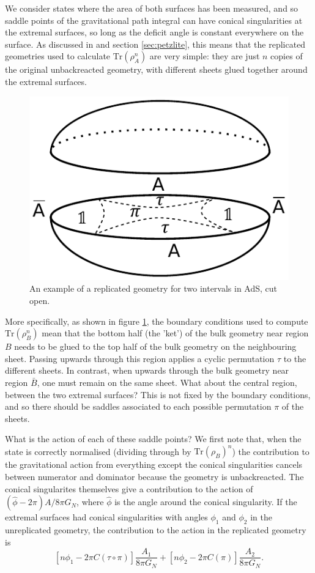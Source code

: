 \documentclass[12pt]{article}
\numberwithin{equation}{section}
\def\tr{\text{Tr}}
\begin{document}
We consider states where the area of both surfaces has been measured, and so saddle points of the gravitational path integral can have conical singularities at the extremal surfaces, so long as the deficit angle is constant everywhere on the surface. As discussed in \cite{Akers:2018fow,Dong:2018seb} and section \ref{sec:petzlite}, this means that the replicated geometries used to calculate $\tr(\rho_A^n)$ are very simple: they are just $n$ copies of the original unbackreacted geometry, with different sheets glued together around the extremal surfaces.
\begin{figure}[t]
\begin{center}
\includegraphics[width = .4\textwidth]{images/permutationRegions.pdf}
\caption{{\small An example of a replicated geometry for two intervals in AdS, cut open.}}\label{fig:twointerval}
\end{center}
\end{figure}

More specifically, as shown in figure \ref{fig:twointerval}, the boundary conditions used to compute $\tr(\rho_B^n)$ mean that the bottom half (the 'ket') of the bulk geometry near region $B$ needs to be glued to the top half of the bulk geometry on the neighbouring sheet. Passing upwards through this region applies a cyclic permutation $\tau$ to the different sheets. In contrast, when upwards through the bulk geometry near region $\bar B$, one must remain on the same sheet. What about the central region, between the two extremal surfaces? This is not fixed by the boundary conditions, and so there should be saddles associated to each possible permutation $\pi$ of the sheets.

What is the action of each of these saddle points? We first note that, when the state is correctly normalised (dividing through by $\tr(\rho_B)^n$) the contribution to the gravitational action from everything except the conical singularities cancels between numerator and dominator because the geometry is unbackreacted. The conical singularites themselves give a contribution to the action of $(\hat{\phi} - 2 \pi) A/8 \pi G_N$, where $\hat{\phi}$ is the angle around the conical singularity. If the extremal surfaces had conical singularities with angles $\phi_1$ and $\phi_2$ in the unreplicated geometry, the contribution to the action in the replicated geometry is
$$
\left[n \phi_1 - 2 \pi C(\tau \circ \pi)\right] \frac{A_1}{8 \pi G_N} + \left[n \phi_2 - 2 \pi C(\pi)\right] \frac{A_2}{8 \pi G_N}.
$$
\end{document}
